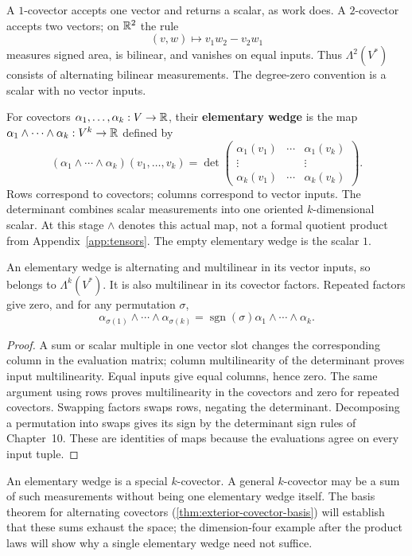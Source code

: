 A $1$-covector accepts one vector and returns a scalar, as work does.
A $2$-covector accepts two vectors; on $\mathbb{R}^2$ the rule
\[
(v,w)\longmapsto v_1w_2-v_2w_1
\]
measures signed area, is bilinear, and vanishes on equal inputs.
Thus $\Lambda^2(V^*)$ consists of alternating bilinear measurements.
The degree-zero convention is a scalar with no vector inputs.

\begin{definition}\label{def:elementary-wedge}
For covectors $\alpha_1,\ldots,\alpha_k:V\to\mathbb{R}$, their
\textbf{elementary wedge} is the map
$\alpha_1\wedge\cdots\wedge\alpha_k:V^k\to\mathbb{R}$ defined by
\[
(\alpha_1\wedge\cdots\wedge\alpha_k)(v_1,\ldots,v_k)
=\det\begin{pmatrix}
\alpha_1(v_1)&\cdots&\alpha_1(v_k)\\
\vdots&&\vdots\\
\alpha_k(v_1)&\cdots&\alpha_k(v_k)
\end{pmatrix}.
\]
Rows correspond to covectors; columns correspond to vector inputs.
The determinant combines scalar measurements into one oriented
$k$-dimensional scalar. At this stage $\wedge$ denotes this actual map,
not a formal quotient product from Appendix~\ref{app:tensors}.
The empty elementary wedge is the scalar $1$.
\end{definition}
\begin{proposition}\label{prop:elementary-wedge-identities}
An elementary wedge is alternating and multilinear in its vector inputs,
so belongs to $\Lambda^k(V^*)$. It is also multilinear in its covector
factors. Repeated factors give zero, and for any permutation $\sigma$,
\[
\alpha_{\sigma(1)}\wedge\cdots\wedge\alpha_{\sigma(k)}
=\operatorname{sgn}(\sigma)\alpha_1\wedge\cdots\wedge\alpha_k.
\]
\end{proposition}
\begin{proof}
A sum or scalar multiple in one vector slot changes the corresponding
column in the evaluation matrix; column multilinearity of the determinant
proves input multilinearity. Equal inputs give equal columns, hence zero.
The same argument using rows proves multilinearity in the covectors and
zero for repeated covectors. Swapping factors swaps rows, negating the
determinant. Decomposing a permutation into swaps gives its sign by
the determinant sign rules of Chapter~10. These are identities of maps
because the evaluations agree on every input tuple.
\end{proof}
An elementary wedge is a special $k$-covector. A general $k$-covector may
be a sum of such measurements without being one elementary wedge itself.
The basis theorem for alternating covectors
(\cref{thm:exterior-covector-basis}) will establish that these sums exhaust the space; the
dimension-four example after the product laws will show why a single
elementary wedge need not suffice.

